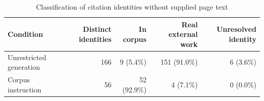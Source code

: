 \begin{table}[ht]
\centering
\caption{Classification of citation identities without supplied page text}
\begin{tabular}{lrrrr}
\toprule
Condition & Distinct identities & In corpus & Real external work & Unresolved identity \\
\midrule
Unrestricted generation & 166 & 9 (5.4\%) & 151 (91.0\%) & 6 (3.6\%) \\
Corpus instruction & 56 & 52 (92.9\%) & 4 (7.1\%) & 0 (0.0\%) \\
\bottomrule
\end{tabular}
\end{table}
